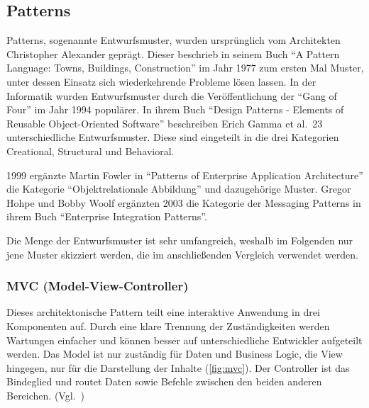 \newpage

\subsection{Patterns}
Patterns, sogenannte Entwurfsmuster, wurden ursprünglich vom Architekten Christopher Alexander geprägt.
Dieser beschrieb in seinem Buch \enquote{A Pattern Language: Towns, Buildings, Construction}\cite{a-pattern-language} im Jahr 1977 zum ersten Mal Muster, unter dessen Einsatz sich wiederkehrende Probleme lösen lassen.
In der Informatik wurden Entwurfsmuster durch die Veröffentlichung der \enquote{Gang of Four} im Jahr 1994 populärer.
In ihrem Buch \enquote{Design Patterns - Elements of Reusable Object-Oriented Software}\cite{gamma-design-patterns} beschreiben Erich Gamma et al.\ 23 unterschiedliche Entwurfsmuster.
Diese sind eingeteilt in die drei Kategorien Creational, Structural und Behavioral.

1999 ergänzte Martin Fowler in \enquote{Patterns of Enterprise Application Architecture}\cite{patterns-of-enterprise-application-architecture} die Kategorie \enquote{Objektrelationale Abbildung} und dazugehörige Muster.
Gregor Hohpe und Bobby Woolf ergänzten 2003 die Kategorie der Messaging Patterns in ihrem Buch \enquote{Enterprise Integration Patterns}\cite{enterprise-integration-patterns}.

Die Menge der Entwurfsmuster ist sehr umfangreich, weshalb im Folgenden nur jene Muster skizziert werden, die im anschließenden Vergleich verwendet werden.

\subsubsection{MVC (Model-View-Controller)}
Dieses architektonische Pattern teilt eine interaktive Anwendung in drei Komponenten auf.
Durch eine klare Trennung der Zuständigkeiten werden Wartungen einfacher und können besser auf unterschiedliche Entwickler aufgeteilt werden.
Das Model ist nur zuständig für Daten und Business Logic, die View hingegen, nur für die Darstellung der Inhalte (\ref{fig:mvc}).
Der Controller ist das Bindeglied und routet Daten sowie Befehle zwischen den beiden anderen Bereichen.
(Vgl.~\cite{buschmann-pattern-oriented-software-architecture})

